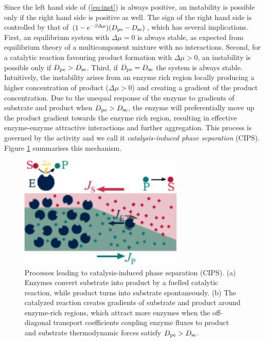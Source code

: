 Since the left hand side of (\ref{eq:inst}) is always positive, an instability is possible only if the right hand side is positive as well. The sign of the right hand side is controlled by that of $(1-e^{-\beta\Delta \mu})(D_{\mathrm{pe}}-D_{\mathrm{se}})$, which has several implications. First, an equilibrium system with $\Delta\mu=0$ is always stable, as expected from equilibrium theory of a multicomponent mixture with no interactions. Second, for a catalytic reaction favouring product formation with $\Delta \mu>0$, an instability is possible only if $D_{\mathrm{pe}}>D_{\mathrm{se}}$. Third, if $D_{\mathrm{pe}}=D_{\mathrm{se}}$ the system is always stable. Intuitively, the instability arises from an enzyme rich region locally producing a higher concentration of product ($\Delta \mu > 0$) and creating a gradient of the product concentration. Due to the unequal response of the enzyme to gradients of substrate and product when $D_{\mathrm{pe}}>D_{\mathrm{se}}$, the enzyme will preferentially move up the product gradient towards the enzyme rich region, resulting in effective enzyme-enzyme attractive interactions and further aggregation. This process is governed by the activity and we call it \textit{catalysis-induced phase separation} (CIPS). Figure \ref{fig:cips_scheme} summarises this mechanism.

\begin{figure}
    \centering
    \includegraphics[width=0.7\textwidth]{figures/cips_scheme.pdf}
    \caption{Processes leading to catalysis-induced phase separation (CIPS). 
		(a) Enzymes convert substrate into product by a fuelled catalytic reaction, while product turns into substrate spontaneously. (b) The catalyzed reaction creates gradients of substrate and product around enzyme-rich regions, which attract more enzymes when the off-diagonal transport coefficients coupling enzyme fluxes to product and substrate thermodynamic forces satisfy $D_{\mathrm{pe}}>D_{\mathrm{se}}$.}
    \label{fig:cips_scheme}
\end{figure}

